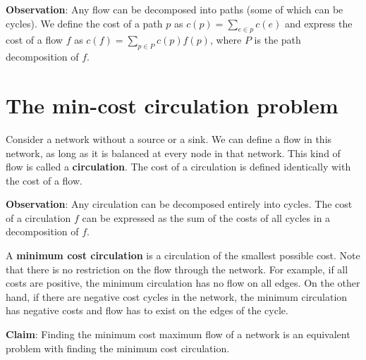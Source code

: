 \documentclass{article}
\begin{document}
\textbf{Observation}:
Any flow can be decomposed into paths (some of which can be cycles). We define the cost of a path $p$ as $c(p) = \sum_{e\in p} c(e)$ and express the cost of a flow $f$ as $c(f) = \sum_{p\in P} c(p)f(p)$, where $P$ is the path decomposition of $f$. 

\section{The min-cost circulation problem}

Consider a network without a source or a sink. We can define a flow in this network, as long as it is balanced at every node in that network. This kind of flow is called a {\bf circulation}. The cost of a circulation is defined identically with the cost of a flow. 

\textbf{Observation}:
Any circulation can be decomposed entirely into cycles. The cost of a circulation $f$ can be expressed as the sum of the costs of all cycles in a decomposition of $f$. 

A {\bf minimum cost circulation} is a circulation of the smallest possible cost. Note that there is no restriction on the flow through the network. For example, if all costs are positive, the minimum circulation has no flow on all edges. On the other hand, if there are negative cost cycles in the network, the minimum circulation has negative costs and flow has to exist on the edges of the cycle.

\textbf{Claim}:
Finding the minimum cost maximum flow of a network is an equivalent problem with finding the minimum cost circulation.
\end{document}
